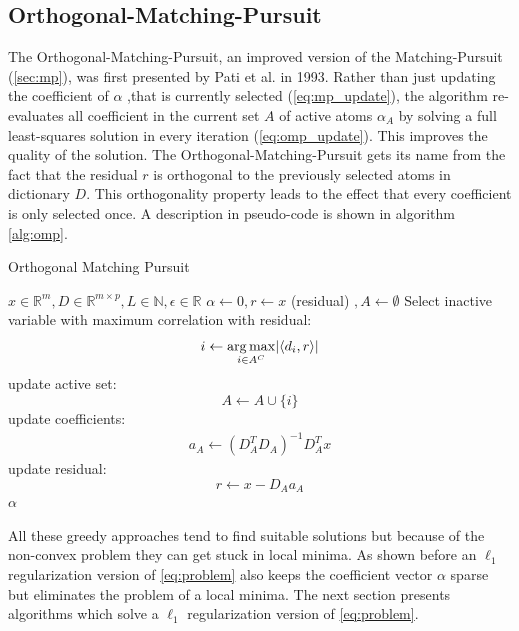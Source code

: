 \subsection{Orthogonal-Matching-Pursuit}
\label{sec:omp}
The Orthogonal-Matching-Pursuit, an improved version of
the Matching-Pursuit (\ref{sec:mp}), was first presented by Pati et al.
in 1993\cite{Pati1993}. Rather than just updating the coefficient of $\alpha$
,that is currently selected (\ref{eq:mp_update}), the algorithm re-evaluates
all coefficient in the current set $A$ of active atoms 
$\alpha_A$ by solving a full least-squares solution in every iteration
(\ref{eq:omp_update}). This improves the quality of the
solution\cite{Pati1993}. The Orthogonal-Matching-Pursuit gets its name from
the fact that the residual $r$ is orthogonal to the previously selected atoms
in dictionary $D$. This orthogonality property leads to the effect that every
coefficient is only selected once. A description in pseudo-code is shown in
algorithm \ref{alg:omp}.
\begin{algorithm}[H]
\caption{Orthogonal Matching Pursuit}
\label{alg:omp}
\begin{algorithmic}[1]
\REQUIRE $x \in \mathbb{R}^m, D \in \mathbb{R}^{m\times p}, L \in \mathbb{N},
\epsilon \in \mathbb{R}$
\STATE $\alpha \gets 0, r \gets x $ (residual) $, A \gets \emptyset$
\STATE Select inactive variable with maximum correlation with residual: 
\begin{equation*}
i \gets \operatorname*{arg\,max}_{i \in A^C} \lvert \left<d_i,r\right> \rvert
\end{equation*}
\STATE update active set:
\begin{equation*}
 A \gets A \cup \{i\} 
\end{equation*}
\STATE update coefficients: 
\begin{align}
a_A \gets \left( D_A^T D_A \right)^{-1} D_A^T x  \label{eq:omp_update}
\end{align}\label{alg:OMP_DTD}
\STATE update residual:
\begin{equation*}
 r \gets x-D_Aa_A
\end{equation*}
\ENDFOR
\RETURN $\alpha$
\end{algorithmic}
\end{algorithm}

All these greedy approaches tend to find suitable solutions but
because of the non-convex problem they can get stuck in local minima. As shown
before an $\ell_1$ regularization version of \ref{eq:problem} also keeps the
coefficient vector $\alpha$ sparse but eliminates the problem of a local minima.
The next section presents algorithms which solve  a $\ell_1$ regularization
version of \ref{eq:problem}.


